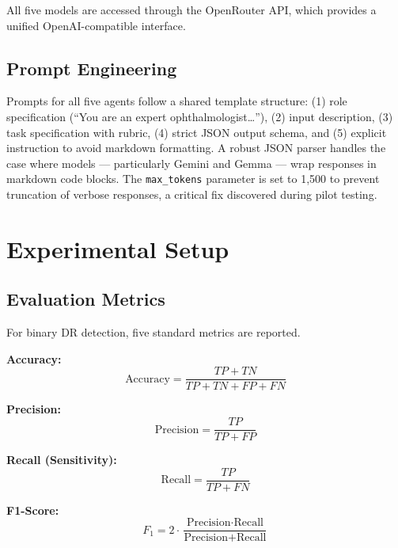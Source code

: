 \documentclass[11pt,a4paper]{article}
\begin{document}
All five models are accessed through the OpenRouter API, which provides a unified OpenAI-compatible interface.

\subsection{Prompt Engineering}

Prompts for all five agents follow a shared template structure: (1) role specification (``You are an expert ophthalmologist\ldots''), (2) input description, (3) task specification with rubric, (4) strict JSON output schema, and (5) explicit instruction to avoid markdown formatting. A robust JSON parser handles the case where models --- particularly Gemini and Gemma --- wrap responses in markdown code blocks. The \texttt{max\_tokens} parameter is set to 1,500 to prevent truncation of verbose responses, a critical fix discovered during pilot testing.

\section{Experimental Setup}

\subsection{Evaluation Metrics}

For binary DR detection, five standard metrics are reported.

\textbf{Accuracy:}
\begin{equation}
\text{Accuracy} = \frac{TP + TN}{TP + TN + FP + FN}
\end{equation}

\textbf{Precision:}
\begin{equation}
\text{Precision} = \frac{TP}{TP + FP}
\end{equation}

\textbf{Recall (Sensitivity):}
\begin{equation}
\text{Recall} = \frac{TP}{TP + FN}
\end{equation}

\textbf{F1-Score:}
\begin{equation}
F_1 = 2 \cdot \frac{\text{Precision} \cdot \text{Recall}}{\text{Precision} + \text{Recall}}
\end{equation}
\end{document}
